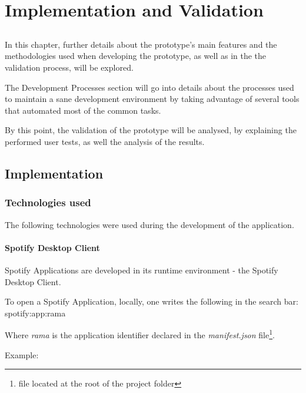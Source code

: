 

\chapter{Implementation and Validation}
\label{chap:chap4}

\section*{}

In this chapter, further details about the prototype's main features and the methodologies used when developing the prototype, as well as in the the validation process, will be explored.

The Development Processes section will go into details about the processes used to maintain a sane development environment by taking advantage of several tools that automated most of the common tasks.

By this point, the validation of the prototype will be analysed, by explaining the performed user tests, as well the analysis of the results.


\section{Implementation} %
\label{sec:implementation}

    
  \subsection{Technologies used} %
  \label{sub:technologies}

    The following technologies were used during the development of the application.

    \subsubsection{Spotify Desktop Client} %
    \label{ssub:subsection_name}
      Spotify Applications are developed in its runtime environment - the Spotify Desktop Client.

      To open a Spotify Application, locally, one writes the following in the search bar: spotify:app:rama

      Where \emph{rama} is the application identifier declared in the \emph{manifest.json} file\footnote{file located at the root of the project folder}.

      Example:

